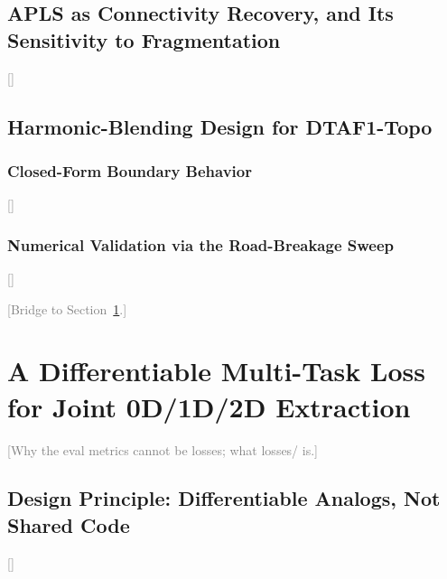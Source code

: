 \documentclass[sigconf]{acmart}
\newcommand{\tbd}[1]{\textcolor{gray}{[#1]}}
\begin{document}
\subsection{APLS as Connectivity Recovery, and Its Sensitivity to Fragmentation}
\label{subsec:apls-recovery}
\tbd{}

\begin{table}
  \caption{Road-breakage sweep: DTAF1 vs.\ CBHM vs.\ APLS vs.\ DTAF1-Topo.}
  \label{tab:breakage-topo}
\end{table}

\subsection{Harmonic-Blending Design for DTAF1-Topo}
\label{subsec:dtaf1topo}

\subsubsection{Closed-Form Boundary Behavior}
\tbd{}

\subsubsection{Numerical Validation via the Road-Breakage Sweep}
\tbd{}

\tbd{Bridge to Section~\ref{sec:method}.}

\section{A Differentiable Multi-Task Loss for Joint 0D/1D/2D Extraction}
\label{sec:method}

\tbd{Why the eval metrics cannot be losses; what losses/ is.}

\subsection{Design Principle: Differentiable Analogs, Not Shared Code}
\label{subsec:method-principle}
\tbd{}

\begin{table}
  \caption{Eval metric $\leftrightarrow$ differentiable loss term correspondence.}
  \label{tab:correspondence}
\end{table}
\end{document}
